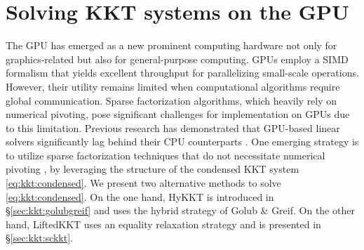 \section{Solving KKT systems on the GPU}
The GPU has emerged as a new prominent computing hardware not only for graphics-related but also for general-purpose computing.
GPUs employ a SIMD formalism that yields excellent throughput for parallelizing small-scale operations.
However, their utility remains limited when computational algorithms require global communication.
Sparse factorization algorithms, which heavily rely on numerical pivoting, pose significant challenges for implementation on GPUs due to this limitation. Previous research has demonstrated that GPU-based linear solvers significantly lag behind their CPU counterparts \cite{tasseff2019exploring,swirydowicz2021linear}.
One emerging strategy is to utilize sparse factorization techniques that do not necessitate numerical pivoting \cite{regev2023hykkt,shin2023accelerating},
by leveraging the structure of the condensed KKT system \eqref{eq:kkt:condensed}.
We present two alternative methods to solve \eqref{eq:kkt:condensed}.
On the one hand, HyKKT is introduced in \S\ref{sec:kkt:golubgreif} and uses the hybrid
strategy of Golub \& Greif.
On the other hand, LiftedKKT uses an equality relaxation strategy and
is presented in \S\ref{sec:kkt:sckkt}.

